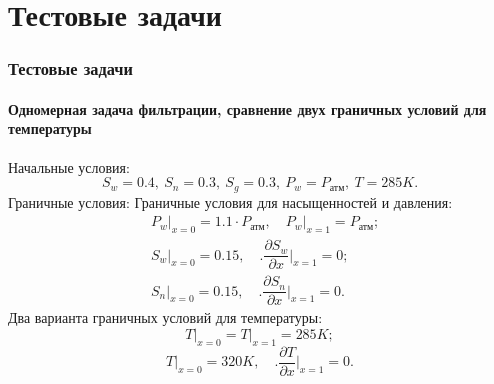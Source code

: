 \section{Тестовые задачи}

\begin{frame}
\begin{center}
\frametitle{Тестовые задачи}
\framesubtitle{Одномерная задача фильтрации, сравнение двух граничных условий для температуры}
Начальные условия:
\begin{equation*}
    S_w=0.4,\ S_n=0.3,\ S_g=0.3,\ P_w=P_\text{атм},\ T=285K.
\end{equation*}
Граничные условия:
Граничные условия для насыщенностей и давления:
\begin{equation*}
  \begin{aligned}
    &\left.P_w\right|_{x=0}=1.1\cdot P_{\text{атм}},\quad \left.{P_w}\right|_{x=1}=P_{\text{атм}};\\
    &\left.S_w\right|_{x=0}=0.15,\quad \Biggl.\dfrac{\partial{S_w}}{\partial{x}}\Biggr|_{x=1}=0;\\
    &\left.S_n\right|_{x=0}=0.15,\quad \Biggl.\dfrac{\partial{S_n}}{\partial{x}}\Biggr|_{x=1}=0.
  \end{aligned}
\end{equation*}
Два варианта граничных условий для температуры:
\begin{equation} \label{noT} \left.T\right|_{x=0}=\left.T\right|_{x=1}=285K; \end{equation}
\begin{equation} \label{T} \left.T\right|_{x=0}=320K,\quad \Biggl.\dfrac{\partial{T}}{\partial{x}}\Biggr|_{x=1}=0. \end{equation}
\end{center}
\end{frame}

